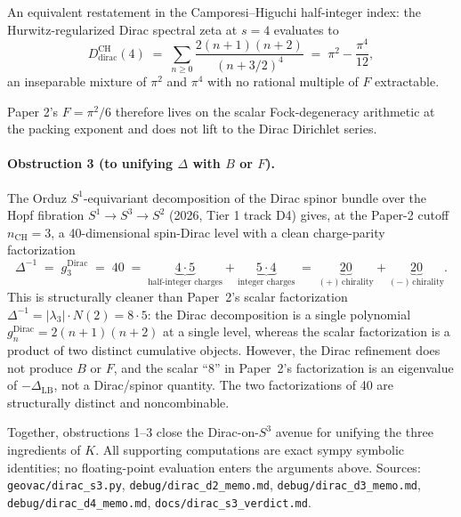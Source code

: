 \documentclass[aps,prl,twocolumn,superscriptaddress]{revtex4-2}
\begin{document}
An equivalent restatement in the Camporesi--Higuchi half-integer index:
the Hurwitz-regularized Dirac spectral zeta at $s=4$ evaluates to
\begin{equation}\label{eq:D_dirac_ch}
  D_{\text{dirac}}^{\text{CH}}(4)
  \;=\; \sum_{n\geq 0}\frac{2(n+1)(n+2)}{(n+3/2)^{4}}
  \;=\; \pi^{2} - \frac{\pi^{4}}{12},
\end{equation}
an inseparable mixture of $\pi^{2}$ and $\pi^{4}$ with no rational
multiple of $F$ extractable.

Paper 2's $F = \pi^{2}/6$ therefore lives on the scalar Fock-degeneracy
arithmetic at the packing exponent and does not lift to the Dirac
Dirichlet series.

\paragraph{Obstruction 3 (to unifying $\Delta$ with $B$ or $F$).}
The Orduz $S^{1}$-equivariant decomposition of the Dirac spinor bundle
over the Hopf fibration $S^{1} \to S^{3} \to S^{2}$ (2026, Tier 1 track
D4) gives, at the Paper-2 cutoff $n_{\text{CH}} = 3$, a 40-dimensional
spin-Dirac level with a clean charge-parity factorization
\begin{equation}\label{eq:Delta_hopf}
  \Delta^{-1} \;=\; g_{3}^{\text{Dirac}} \;=\; 40
  \;=\; \underbrace{4 \cdot 5}_{\text{half-integer charges}}
      + \underbrace{5 \cdot 4}_{\text{integer charges}}
  \;=\; \underbrace{20}_{(+)\,\text{chirality}}
      + \underbrace{20}_{(-)\,\text{chirality}}.
\end{equation}
This is structurally cleaner than Paper~2's scalar factorization
$\Delta^{-1} = |\lambda_{3}|\cdot N(2) = 8 \cdot 5$: the Dirac
decomposition is a single polynomial $g_{n}^{\text{Dirac}} = 2(n+1)(n+2)$
at a single level, whereas the scalar factorization is a product of two
distinct cumulative objects. However, the Dirac refinement does not
produce $B$ or $F$, and the scalar ``8'' in Paper~2's factorization is
an eigenvalue of $-\Delta_{\text{LB}}$, not a Dirac/spinor quantity.
The two factorizations of 40 are structurally distinct and
noncombinable.

Together, obstructions 1--3 close the Dirac-on-$S^{3}$ avenue for
unifying the three ingredients of $K$. All supporting computations are
exact sympy symbolic identities; no floating-point evaluation enters
the arguments above. Sources:
\texttt{geovac/dirac\_s3.py},
\texttt{debug/dirac\_d2\_memo.md},
\texttt{debug/dirac\_d3\_memo.md},
\texttt{debug/dirac\_d4\_memo.md},
\texttt{docs/dirac\_s3\_verdict.md}.
\end{document}
